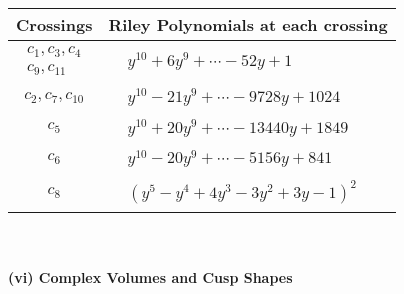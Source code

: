 \documentclass[1p]{elsarticle_modified}
\theoremstyle{definition}
\begin{document}
\begin{tabular}{m{50pt}|m{274pt}}
Crossings & \hspace{64pt}Riley Polynomials at each crossing \\
\hline $$\begin{aligned}c_{1},c_{3},c_{4}\\c_{9},c_{11}\end{aligned}$$&$\begin{aligned}
&y^{10}+6 y^9+\cdots-52 y+1
\end{aligned}$\\
\hline $$\begin{aligned}c_{2},c_{7},c_{10}\end{aligned}$$&$\begin{aligned}
&y^{10}-21 y^9+\cdots-9728 y+1024
\end{aligned}$\\
\hline $$\begin{aligned}c_{5}\end{aligned}$$&$\begin{aligned}
&y^{10}+20 y^9+\cdots-13440 y+1849
\end{aligned}$\\
\hline $$\begin{aligned}c_{6}\end{aligned}$$&$\begin{aligned}
&y^{10}-20 y^9+\cdots-5156 y+841
\end{aligned}$\\
\hline $$\begin{aligned}c_{8}\end{aligned}$$&$\begin{aligned}
&(y^5- y^4+4 y^3-3 y^2+3 y-1)^2
\end{aligned}$\\
\hline
\end{tabular}\\~\\
\newpage\flushleft \textbf{(vi) Complex Volumes and Cusp Shapes}
\end{document}
